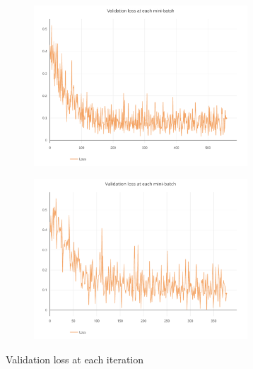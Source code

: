 \documentclass[journal]{IEEEtran}
\begin{document}
\begin{figure}[h]
	\centering

	\begin{subfigure}{0.49\textwidth}
		\centering
		\includegraphics[height = 6cm]{Images/minibatchvalloss.pdf}
	\end{subfigure}
	\hspace{1mm}
	\begin{subfigure}{0.49\textwidth}
		\centering
		\includegraphics[height = 6cm]{Images/minibatchvalloss1.pdf}
	\end{subfigure}
	
	\caption{Validation loss at each iteration}
\end{figure}
\end{document}
